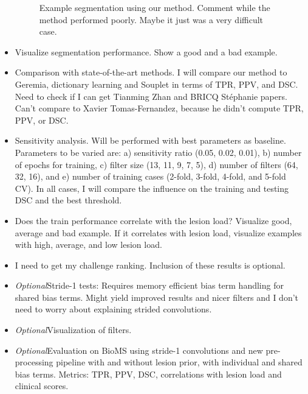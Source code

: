 \begin{itemize}

\begin{figure}[tb]
\centering
{}
\caption{Example segmentation using our method. Comment while the method
performed poorly. Maybe it just was a very difficult case.}
\end{figure}

\item Visualize segmentation performance. Show a good and a bad example.
  
\item Comparison with state-of-the-art methods. I will compare our method to
Geremia, dictionary learning and Souplet in terms of TPR, PPV, and DSC. Need to
check if I can get Tianming Zhan and  BRICQ St\'ephanie papers. Can't compare to
Xavier Tomas-Fernandez, because he didn't compute TPR, PPV, or DSC.

\item Sensitivity analysis. Will be performed with best parameters as baseline.
Parameters to be varied are: a) sensitivity ratio (0.05, 0.02, 0.01), b) number
of epochs for training, c) filter size (13, 11, 9, 7, 5), d) number of filters
(64, 32, 16), and e) number of training cases (2-fold, 3-fold, 4-fold, and
5-fold CV). In all cases, I will compare the influence on the training and
testing DSC and the best threshold.

\item Does the train performance correlate with the lesion load? Visualize good,
average and bad example. If it correlates with lesion load, visualize examples
with high, average, and low lesion load.

\item I need to get my challenge ranking. Inclusion of these results is
optional.

\item \emph{Optional}\quad Stride-1 tests: Requires memory efficient bias term
handling for shared bias terms. Might yield improved results and nicer filters
and I don't need to worry about explaining strided convolutions.

\item \emph{Optional}\quad Visualization of filters.

\item \emph{Optional}\quad Evaluation on BioMS using stride-1 convolutions and
new pre-processing pipeline with and without lesion prior, with individual and
shared bias terms. Metrics: TPR, PPV, DSC, correlations with lesion load and
clinical scores.

\end{itemize}

